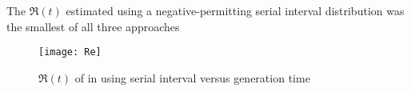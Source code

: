 The $\Re(t)$ estimated using
a negative-permitting serial interval distribution was the smallest of all three approaches %
\par
\begin{figure}[h]
  \centering
  \texttt{[image: Re]}
  \caption{$\Re(t)$ of \covid in \gta using
    serial interval versus generation time}
  \label{fig:Re(t)}
\end{figure}